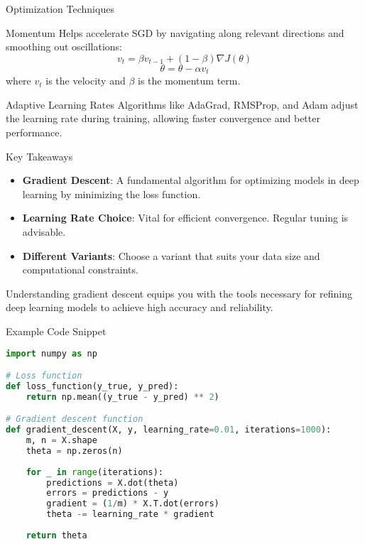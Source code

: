 \documentclass[aspectratio=169]{beamer}
\begin{document}
\begin{frame}[fragile]{Optimization Techniques}
    \begin{block}{Momentum}
        Helps accelerate SGD by navigating along relevant directions and smoothing out oscillations:
        \begin{equation}
        v_t = \beta v_{t-1} + (1 - \beta) \nabla J(\theta)
        \end{equation}
        \begin{equation}
        \theta = \theta - \alpha v_t
        \end{equation}
        where \(v_t\) is the velocity and \(\beta\) is the momentum term.
    \end{block}
    
    \begin{block}{Adaptive Learning Rates}
        Algorithms like AdaGrad, RMSProp, and Adam adjust the learning rate during training, allowing faster convergence and better performance.
    \end{block}
\end{frame}

\begin{frame}[fragile]{Key Takeaways}
    \begin{itemize}
        \item \textbf{Gradient Descent}: A fundamental algorithm for optimizing models in deep learning by minimizing the loss function.
        \item \textbf{Learning Rate Choice}: Vital for efficient convergence. Regular tuning is advisable.
        \item \textbf{Different Variants}: Choose a variant that suits your data size and computational constraints.
    \end{itemize}

    Understanding gradient descent equips you with the tools necessary for refining deep learning models to achieve high accuracy and reliability.
\end{frame}

\begin{frame}[fragile]{Example Code Snippet}
    \begin{lstlisting}[language=Python]
import numpy as np

# Loss function
def loss_function(y_true, y_pred):
    return np.mean((y_true - y_pred) ** 2)

# Gradient descent function
def gradient_descent(X, y, learning_rate=0.01, iterations=1000):
    m, n = X.shape
    theta = np.zeros(n)
    
    for _ in range(iterations):
        predictions = X.dot(theta)
        errors = predictions - y
        gradient = (1/m) * X.T.dot(errors)
        theta -= learning_rate * gradient
    
    return theta
    \end{lstlisting}
\end{frame}
\end{document}
